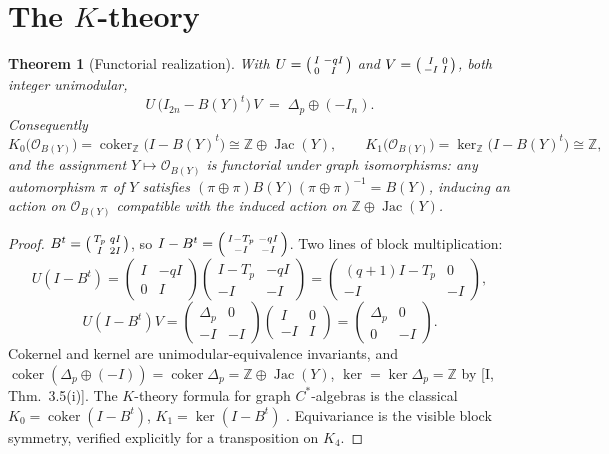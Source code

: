 \documentclass[11pt]{amsart}
\numberwithin{equation}{section}
\newtheorem{theorem}{Theorem}[section]
\theoremstyle{definition}
\theoremstyle{remark}
\newcommand{\Z}{\mathbb{Z}}
\newcommand{\cO}{\mathcal{O}}
\newcommand{\Jac}{\operatorname{Jac}}
\newcommand{\coker}{\operatorname{coker}}
\begin{document}
\section{The \texorpdfstring{$K$}{K}-theory}\label{sec:ktheory}

\begin{theorem}[Functorial realization]\label{thm:ktheory}
With $U=\begin{psmallmatrix}I&-qI\\0&I\end{psmallmatrix}$ and
$V=\begin{psmallmatrix}I&0\\-I&I\end{psmallmatrix}$, both integer unimodular,
\begin{equation}\label{eq:factor}
U\,\bigl(I_{2n}-B(Y)^t\bigr)\,V\;=\;\Delta_p\oplus(-I_n).
\end{equation}
Consequently
\[
K_0\bigl(\cO_{B(Y)}\bigr)=\coker_\Z\bigl(I-B(Y)^t\bigr)\cong\Z\oplus\Jac(Y),
\qquad
K_1\bigl(\cO_{B(Y)}\bigr)=\ker_\Z\bigl(I-B(Y)^t\bigr)\cong\Z ,
\]
and the assignment $Y\mapsto\cO_{B(Y)}$ is functorial under graph isomorphisms: any
automorphism $\pi$ of $Y$ satisfies $(\pi\oplus\pi)B(Y)(\pi\oplus\pi)^{-1}=B(Y)$,
inducing an action on $\cO_{B(Y)}$ compatible with the induced action on
$\Z\oplus\Jac(Y)$.
\end{theorem}

\begin{proof}
$B^t=\begin{psmallmatrix}T_p&qI\\I&2I\end{psmallmatrix}$, so
$I-B^t=\begin{psmallmatrix}I-T_p&-qI\\-I&-I\end{psmallmatrix}$. Two lines of block
multiplication:
\[
U(I-B^t)=\begin{pmatrix}I&-qI\\0&I\end{pmatrix}
\begin{pmatrix}I-T_p&-qI\\-I&-I\end{pmatrix}
=\begin{pmatrix}(q+1)I-T_p&0\\-I&-I\end{pmatrix},
\]
\[
U(I-B^t)V=\begin{pmatrix}\Delta_p&0\\-I&-I\end{pmatrix}
\begin{pmatrix}I&0\\-I&I\end{pmatrix}
=\begin{pmatrix}\Delta_p&0\\0&-I\end{pmatrix}.
\]
Cokernel and kernel are unimodular-equivalence invariants, and
$\coker(\Delta_p\oplus(-I))=\coker\Delta_p=\Z\oplus\Jac(Y)$,
$\ker=\ker\Delta_p=\Z$ by [I, Thm.~3.5(i)]. The $K$-theory formula for graph
$C^*$-algebras is the classical
$K_0=\coker(I-B^t)$, $K_1=\ker(I-B^t)$ \cite{CK}. Equivariance is the visible block
symmetry, verified explicitly for a transposition on $K_4$.
\end{proof}
\end{document}
